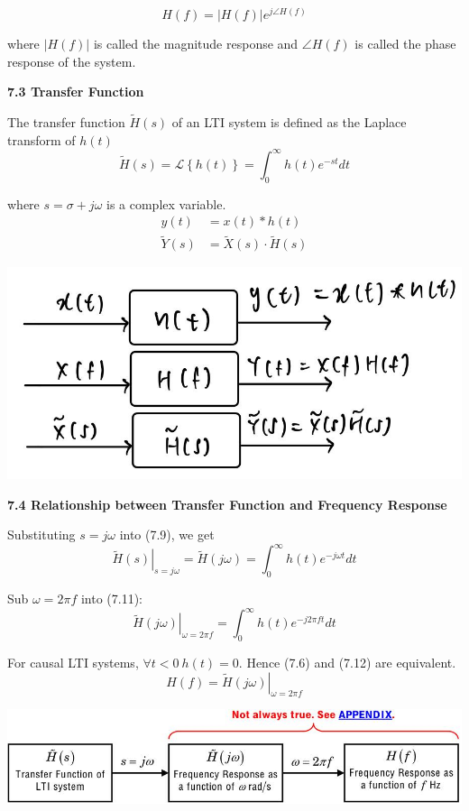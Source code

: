\documentclass[landscape,a4paper]{extarticle}
\newenvironment{Figure}
  {\par\medskip\noindent\minipage{\linewidth}}
  {\endminipage\par\medskip}
\newcommand{\lap}[1]{\mathcal{L}\left\{#1\right\}}
\begin{document}
\begin{multicols*}{5}
    \[
        H(f) = |H(f)| e^{j \angle H(f)} \tag{7.8}
    \]

    where $|H(f)|$ is called the magnitude response and $\angle H(f)$ is called the phase response of the system.

    \textbf{7.3 Transfer Function}

    The transfer function $\tilde{H}(s)$ of an LTI system is defined as the Laplace transform of $h(t)$
    \[
        \tilde{H}(s) = \lap{h(t)} = \int_{0}^{\infty}h(t) e^{-st} dt \tag{7.9}
    \]

    where $s = \sigma + j \omega$ is a complex variable.
    \begin{align*}
        y(t) &= x(t) * h(t)\\
        \tilde{Y}(s) &= \tilde{X}(s) \cdot \tilde{H}(s) \tag{7.10}
    \end{align*}
    \begin{Figure}
        \centering
        \includegraphics[width=0.7\linewidth]{LTI_ht_hf_hs.jpg}        
    \end{Figure}

    \textbf{7.4 Relationship between Transfer Function and Frequency Response}

    Substituting $s = j \omega$ into (7.9), we get 
    \[
        \left.\tilde{H}(s)\right|_{s=j\omega} = \tilde{H}(j \omega) = \int_{0}^{\infty}h(t)e^{-j \omega t} dt \tag{7.11}
    \]

    Sub $\omega = 2 \pi f$ into (7.11):
    \[
        \left.\tilde{H}(j\omega)\right|_{\omega = 2\pi f} = \int_{0}^{\infty} h(t) e^{-j2\pi f t}dt \tag{7.12}
    \]

    For causal LTI systems, $\forall t < 0\ h(t) = 0$. Hence (7.6) and (7.12) are equivalent.
    \[
        H(f) = \left.\tilde{H}(j \omega)\right|_{\omega=2\pi f} \tag{7.13}
    \]

    \begin{Figure}
        \centering
        \includegraphics[width=\linewidth]{transferFunc_freqResponse.jpg}        
    \end{Figure}


\end{multicols*}
\end{document}
